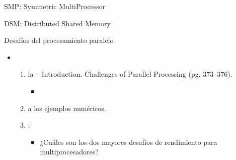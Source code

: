 \begin{frame}[t]{SMP: Symmetric MultiProcessor}
\makebox[\textwidth][c]{}
\end{frame}

\begin{frame}[t]{DSM: Distributed Shared Memory}
\makebox[\textwidth][c]{}
\end{frame}

\begin{frame}[t]{Desafíos del procesamiento paralelo}
\begin{itemize}
  \item {}
    \begin{enumerate}
      \item {} la  -- Introduction.
            Challenges of Parallel Processing (pg. 373--376).
        \begin{itemize}
          \item \bibhennessy
        \end{itemize}

      \item {} a los ejemplos numéricos.

      \item {}:
        \begin{itemize}
          \item ¿Cuáles son los dos mayores desafíos de rendimiento para multiprocesadores?
        \end{itemize}
    \end{enumerate}
\end{itemize}
\end{frame}

